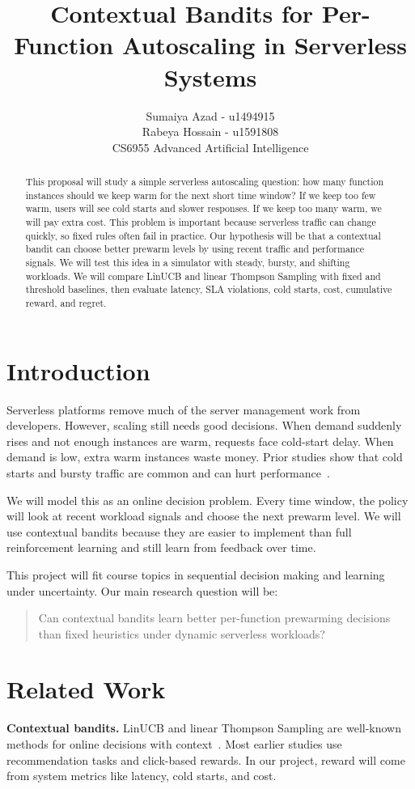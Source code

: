 \documentclass{article}
\title{Contextual Bandits for Per-Function Autoscaling in Serverless Systems}
\author{
  Sumaiya Azad - u1494915 \\
  Rabeya Hossain - u1591808\\
  CS6955 Advanced Artificial Intelligence
}
\begin{document}
\maketitle

\begin{abstract}
This proposal will study a simple serverless autoscaling question: how many function instances should we keep warm for the next short time window? If we keep too few warm, users will see cold starts and slower responses. If we keep too many warm, we will pay extra cost. This problem is important because serverless traffic can change quickly, so fixed rules often fail in practice. Our hypothesis will be that a contextual bandit can choose better prewarm levels by using recent traffic and performance signals. We will test this idea in a simulator with steady, bursty, and shifting workloads. We will compare LinUCB and linear Thompson Sampling with fixed and threshold baselines, then evaluate latency, SLA violations, cold starts, cost, cumulative reward, and regret.
\end{abstract}

\section{Introduction}
Serverless platforms remove much of the server management work from developers. However, scaling still needs good decisions. When demand suddenly rises and not enough instances are warm, requests face cold-start delay. When demand is low, extra warm instances waste money. Prior studies show that cold starts and bursty traffic are common and can hurt performance~\cite{wang2018peeking,lloyd2018serverless,shahrad2020serverless}.

We will model this as an online decision problem. Every time window, the policy will look at recent workload signals and choose the next prewarm level. We will use contextual bandits because they are easier to implement than full reinforcement learning and still learn from feedback over time.

This project will fit course topics in sequential decision making and learning under uncertainty. Our main research question will be:
\begin{quote}
Can contextual bandits learn better per-function prewarming decisions than fixed heuristics under dynamic serverless workloads?
\end{quote}

\section{Related Work}
\textbf{Contextual bandits.}
LinUCB and linear Thompson Sampling are well-known methods for online decisions with context~\cite{li2010contextual,chu2011contextual,agrawal2013thompson,slivkins2019intro}. Most earlier studies use recommendation tasks and click-based rewards. In our project, reward will come from system metrics like latency, cold starts, and cost.
\end{document}
